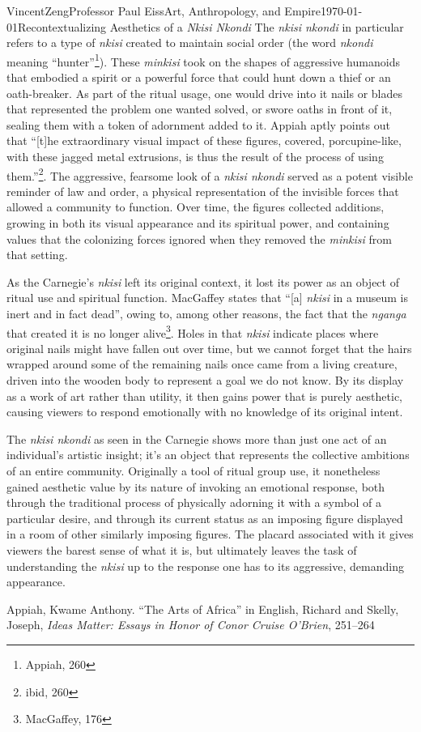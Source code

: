 \documentclass[12pt]{article}
\begin{document}
\begin{mla}{Vincent}{Zeng}{Professor Paul Eiss}{Art, Anthropology, and
    Empire}{\today}{Recontextualizing Aesthetics of a \textit{Nkisi Nkondi}}
The \textit{nkisi nkondi} in particular refers to a type of \textit{nkisi}
created to maintain social order (the word \textit{nkondi} meaning
``hunter''\footnote{Appiah, 260}). These \textit{minkisi} took on the shapes of
aggressive humanoids that embodied a spirit or a powerful force that could hunt
down a thief or an oath-breaker. As part of the ritual usage, one would drive
into it nails or blades that represented the problem one wanted solved, or swore
oaths in front of it, sealing them with a token of adornment added to it. Appiah
aptly points out that ``[t]he extraordinary visual impact of these figures,
covered, porcupine-like, with these jagged metal extrusions, is thus the result
of the process of using them.''\footnote{ibid, 260}. The aggressive, fearsome
look of a \textit{nkisi nkondi} served as a potent visible reminder of law and
order, a physical representation of the invisible forces that allowed a community
to function. Over time, the figures collected additions, growing in both its
visual appearance and its spiritual power, and containing values that the
colonizing forces ignored when they removed the \textit{minkisi} from that
setting.

As the Carnegie's \textit{nkisi} left its original context, it lost
its power as an object of ritual use and spiritual function. MacGaffey states
that ``[a] \textit{nkisi} in a museum is inert and in fact dead'', owing to,
among other reasons, the fact that the \textit{nganga} that created it is
no longer alive\footnote{MacGaffey, 176}. Holes in that \textit{nkisi} indicate
places where original nails might have fallen out over time, but we cannot
forget that the hairs wrapped around some of the remaining nails once came from
a living creature, driven into the wooden body to represent a goal we do not
know. By its display as a work of art rather than utility, it then gains power
that is purely aesthetic, causing viewers to respond emotionally with no
knowledge of its original intent.

The \textit{nkisi nkondi} as seen in the Carnegie shows more than just one
act of an individual's artistic insight; it's an object that represents the
collective ambitions of an entire community. Originally a tool of ritual group
use, it nonetheless gained aesthetic value by its nature of invoking an
emotional response, both through the traditional process of physically adorning
it with a symbol of a particular desire, and through its current status as an
imposing figure displayed in a room of other similarly imposing figures. The
placard associated with it gives viewers the barest sense of what it is, but
ultimately leaves the task of understanding the \textit{nkisi} up to the
response one has to its aggressive, demanding appearance.
\begin{workscited}
  \bibent
  Appiah, Kwame Anthony. ``The Arts of Africa'' in English, Richard and Skelly, Joseph, \textit{Ideas Matter: Essays in Honor of Conor Cruise O'Brien}, 251--264


\end{workscited}
\end{mla}
\end{document}
